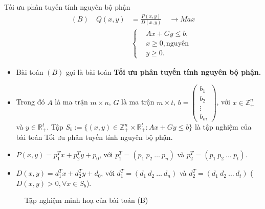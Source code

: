 \documentclass{beamer}
\begin{document}
\begin{frame}{Tối ưu phân tuyến tính nguyên bộ phận} \Large
\begin{equation}
    \begin{split}
    (B) \quad Q(x,y) & = \frac{P(x,y)}{D(x,y)} \quad \longrightarrow Max \\
        & \left\{
        \begin{split}
        &Ax + Gy \leq  b, \\
        &x \geq 0, \text{nguyên} \\
        &y \geq 0.
        \end{split}
        \right.    
    \end{split}
\end{equation}            
\end{frame}
\begin{frame}
\begin{itemize}
\item Bài toán $(B)$ gọi là bài toán \textbf{Tối ưu phân tuyến tính nguyên bộ phận.}
\item Trong đó $A$ là ma trận $m\times n$, $G$ là ma trận $m\times t$, $b=\begin{pmatrix}
    b_1 \\
    b_2 \\
    \vdots \\
    b_m
    \end{pmatrix}$, với $x\in \mathbb{Z}^n_+$ và $y \in \mathbb{R}^t_+$. Tập $S_b:=\{(x,y)\in \mathbb{Z}^n_+ \times \mathbb{R}^t_+: Ax+Gy\leq b\}$ là tập nghiệm của bài toán Tối ưu phân tuyến tính nguyên bộ phận. 
\item $P(x,y)=p^T_1x+p^T_2y+p_0$, với $p^T_1 = (p_1 \: p_2 \: \ldots \: p_n)$ và $p^T_2 = (p_1 \: p_2 \: \ldots \: p_t)$.
\item $D(x,y)=d^T_1x+d^T_2y+d_0$, với $d^T_1 = (d_1 \: d_2 \: \ldots \: d_n)$ và $d^T_2 = (d_1 \: d_2 \: \ldots \: d_t)$ ($D(x,y)>0, \forall x \in S_b$).
\end{itemize}
\end{frame}
\begin{frame}
\begin{figure}
    \caption{Tập nghiệm minh hoạ của bài toán (B)}
    \end{figure}
\end{frame}
\end{document}
